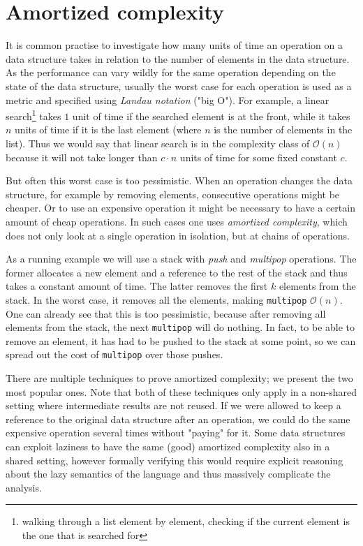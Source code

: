 \documentclass[sigplan,screen]{acmart}
\renewcommand\O[1]{$\mathcal{O}(#1)$}
\begin{document}
\section{Amortized complexity}\label{sec:complexity}

It is common practise to investigate how many units of time an operation on a data structure takes in relation to the number of elements in the data structure. As the performance can vary wildly for the same operation depending on the state of the data structure, usually the worst case for each operation is used as a metric and specified using \textit{Landau notation} ("big O"). For example, a linear search\footnote{walking through a list element by element, checking if the current element is the one that is searched for} takes $1$ unit of time if the searched element is at the front, while it takes $n$ units of time if it is the last element (where $n$ is the number of elements in the list). Thus we would say that linear search is in the complexity class of \O{n} because it will not take longer than $c \cdot n$ units of time for some fixed constant $c$.

But often this worst case is too pessimistic. When an operation changes the data structure, for example by removing elements, consecutive operations might be cheaper. Or to use an expensive operation it might be necessary to have a certain amount of cheap operations. In such cases one uses \textit{amortized complexity}, which does not only look at a single operation in isolation, but at chains of operations.

As a running example we will use a stack with \textit{push} and \textit{multipop} operations. The former allocates a new element and a reference to the rest of the stack and thus takes a constant amount of time. The latter removes the first $k$ elements from the stack. In the worst case, it removes all the elements, making \texttt{multipop} \O{n}. One can already see that this is too pessimistic, because after removing all elements from the stack, the next \texttt{multipop} will do nothing. In fact, to be able to remove an element, it has had to be pushed to the stack at some point, so we can spread out the cost of \texttt{multipop} over those pushes.

There are multiple techniques to prove amortized complexity; we present the two most popular ones. Note that both of these techniques only apply in a non-shared setting where intermediate results are not reused. If we were allowed to keep a reference to the original data structure after an operation, we could do the same expensive operation several times without "paying" for it. Some data structures can exploit laziness to have the same (good) amortized complexity also in a shared setting, however formally verifying this would require explicit reasoning about the lazy semantics of the language and thus massively complicate the analysis.
\end{document}
